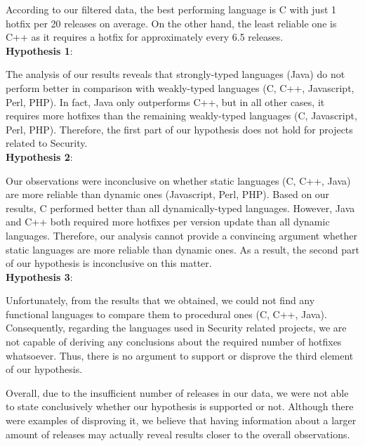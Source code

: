 According to our filtered data, the best performing language is C with just 1 hotfix per 20 releases on average. On the other hand, the least reliable one is C++ as it requires a hotfix for approximately every 6.5 releases.\\

\textbf{Hypothesis 1}:\par
The analysis of our results reveals that strongly-typed languages (Java) do not perform better in comparison with weakly-typed languages (C, C++, Javascript, Perl, PHP). In fact, Java only outperforms C++, but in all other cases, it requires more hotfixes than the remaining weakly-typed languages (C, Javascript, Perl, PHP). Therefore, the first part of our hypothesis does not hold for projects related to Security.\\

\textbf{Hypothesis 2}:\par
Our observations were inconclusive on whether static languages (C, C++, Java) are more reliable than dynamic ones (Javascript, Perl, PHP). Based on our results, C performed better than all dynamically-typed languages. However, Java and C++ both required more hotfixes per version update than all dynamic languages. Therefore, our analysis cannot provide a convincing argument whether static languages are more reliable than dynamic ones. As a result, the second part of our hypothesis is inconclusive on this matter.\\

\textbf{Hypothesis 3}:\par
Unfortunately, from the results that we obtained, we could not find any functional languages to compare them to procedural ones (C, C++, Java).
Consequently, regarding the languages used in Security related projects, we are not capable of deriving any conclusions about the required number of hotfixes whatsoever. Thus, there is no argument to support or disprove the third element of our hypothesis.\par
Overall, due to the insufficient number of releases in our data, we were not able to state conclusively whether our hypothesis is supported or not. Although there were examples of disproving it, we believe that having information about a larger amount of releases may actually reveal results closer to the overall observations.

